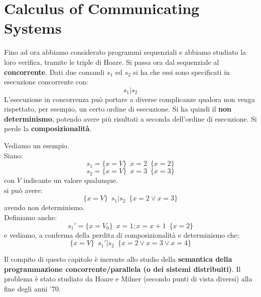 \chapter{Calculus of Communicating Systems}
\label{Capitolo 4}

Fino ad ora abbiamo considerato programmi sequenziali e abbiamo studiato la loro
verifica, tramite le triple di Hoare. Si passa ora dal sequenziale al
\textbf{concorrente}. Dati due comandi $s_1$ ed $s_2$ si ha che essi sono
specificati in esecuzione concorrente con:
\[s_1|s_2\]
L'esecuzione in concorrenza può portare a diverse complicanze qualora non venga
rispettato, per esempio, un certo ordine di esecuzione. Si ha quindi il
\textbf{non determinismo}, potendo avere più risultati a seconda dell'ordine di
esecuzione. Si perde la \textbf{composizionalità}.
\begin{esempio}
  Vediamo un esempio.\\
  Siano:
  \[s_1=\{x=V\}\,\,\, x=2\,\,\,\{x=2\}\]
  \[s_2=\{x=V\}\,\,\, x=3\,\,\,\{x=3\}\]
  con $V$ indicante un valore qualunque.\\
  si può avere:
  \[\{x=V\}\,\,\, s_1|s_2\,\,\,\{x=2\lor x=3\}\]
  avendo non determinismo.\\
  Definiamo anche:
  \[s_1'=\{x=V_0\}\,\,\, x=1;x=x+1\,\,\,\{x=2\}\]
  e vediamo, a conferma della perdita di composizionalità e determinismo che:
  \[\{x=V\}\,\,\, s_1'|s_2\,\,\,\{x=2\lor x=3\lor x=4\}\]
\end{esempio}
Il compito di questo capitolo è inerente allo studio della \textbf{semantica della programmazione
  concorrente/parallela (o dei sistemi distribuiti)}. Il problema è stato studiato da Hoare e Milner (secondo punti di vista diversi) alla fine degli anni '70. 
